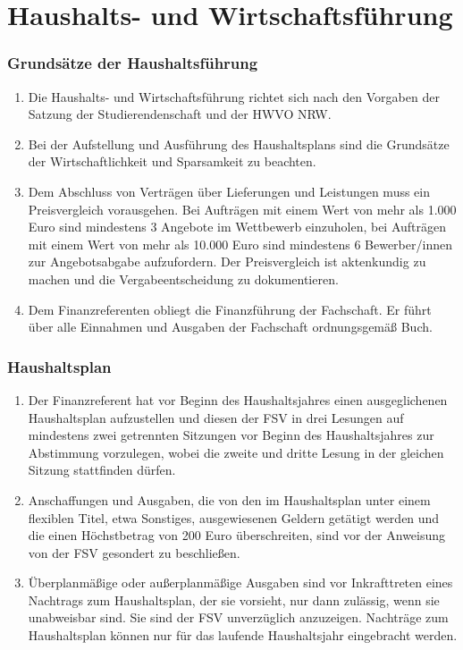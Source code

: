 \documentclass{article}
\begin{document}
\part{Haushalts- und Wirtschaftsführung}
\section{Grundsätze der Haushaltsführung}
\begin{enumerate}[(1)]
    \item Die Haushalts- und Wirtschaftsführung richtet sich nach den Vorgaben der Satzung der Studierendenschaft und der HWVO NRW.
    \item Bei der Aufstellung und Ausführung des Haushaltsplans sind die Grundsätze der Wirtschaftlichkeit und Sparsamkeit zu beachten.
    \item Dem Abschluss von Verträgen über Lieferungen und Leistungen muss ein Preisvergleich vorausgehen. Bei Aufträgen mit einem Wert von mehr als 1.000 Euro sind mindestens 3 Angebote im Wettbewerb einzuholen, bei Aufträgen mit einem Wert von mehr als 10.000 Euro sind mindestens 6 Bewerber/innen zur Angebotsabgabe aufzufordern. Der Preisvergleich ist aktenkundig zu machen und die Vergabeentscheidung zu dokumentieren.
    \item Dem Finanzreferenten obliegt die Finanzführung der Fachschaft. Er führt über alle Einnahmen und Ausgaben der Fachschaft ordnungsgemäß Buch.
\end{enumerate}

\section{Haushaltsplan}
\begin{enumerate}[(1)]
    \item Der Finanzreferent hat vor Beginn des Haushaltsjahres einen ausgeglichenen Haushaltsplan aufzustellen und diesen der FSV in drei Lesungen auf mindestens zwei getrennten Sitzungen vor Beginn des Haushaltsjahres zur Abstimmung vorzulegen, wobei die zweite und dritte Lesung in der gleichen Sitzung stattfinden dürfen.
    \item Anschaffungen und Ausgaben, die von den im Haushaltsplan unter einem flexiblen Titel, etwa \glqq Sonstiges\grqq, ausgewiesenen Geldern getätigt werden und die einen Höchstbetrag von 200 Euro überschreiten, sind vor der Anweisung von der FSV gesondert zu beschließen.
    \item Überplanmäßige oder außerplanmäßige Ausgaben sind vor Inkrafttreten eines Nachtrags zum Haushaltsplan, der sie vorsieht, nur dann zulässig, wenn sie unabweisbar sind. Sie sind der FSV unverzüglich anzuzeigen. Nachträge zum Haushaltsplan können nur für das laufende Haushaltsjahr eingebracht werden.
\end{enumerate}
\end{document}
